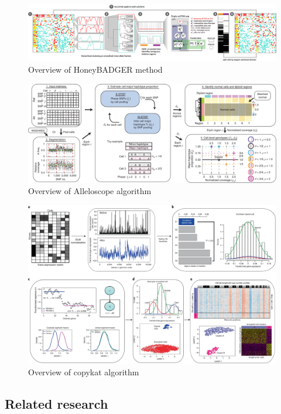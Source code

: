 \documentclass[
]{book}
\begin{document}
\begin{figure}
\centering
\includegraphics{./figs/CNV/HoneyBADGER.png}
\caption{Overview of HoneyBADGER method}
\end{figure}

\begin{figure}
\centering
\includegraphics{./figs/CNV/Alleloscope.jpg}
\caption{Overview of Alleloscope algorithm}
\end{figure}

\begin{figure}
\centering
\includegraphics{./figs/CNV/copykat.jpg}
\caption{Overview of copykat algorithm}
\end{figure}

\hypertarget{related-research}{%
\subsection{Related research}\label{related-research}}
\end{document}
